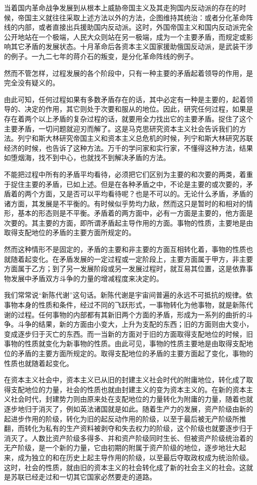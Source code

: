 当着国内革命战争发展到从根本上威胁帝国主义及其走狗国内反动派的存在的时候，帝国主义就往往采取上述方法以外的方法，企图维持其统治：或者分化革命阵线的内部，或者直接出兵援助国内反动派。这时，外国帝国主义和国内反动派完全公开地站在一个极端，人民大众则站在另一极端，成为一个主要矛盾，而规定或影响其它矛盾的发展状态。十月革命后各资本主义国家援助俄国反动派，是武装干涉的例子。一九二七年的蒋介石的叛变，是分化革命阵线的例子。

然而不管怎样，过程发展的各个阶段中，只有一种主要的矛盾起着领导的作用，是完全没有疑义的。

由此可知，任何过程如果有多数矛盾存在的话，其中必定有一种是主要的，起着领导的、决定的作用，其它则处于次要和服从的地位。因此，研究任何过程，如果是存在着两个以上矛盾的复杂过程的话，就要用全力找出它的主要矛盾。捉住了这个主要矛盾，一切问题就迎刃而解了。这是马克思研究资本主义社会告诉我们的方法。列宁和斯大林研究帝国主义和资本主义总危机的时候，列宁和斯大林研究苏联经济的时候，也告诉了这种方法。万千的学问家和实行家，不懂得这种方法，结果如堕烟海，找不到中心，也就找不到解决矛盾的方法。

不能把过程中所有的矛盾平均看待，必须把它们区别为主要的和次要的两类，着重于捉住主要的矛盾，已如上述。但是在各种矛盾之中，不论是主要的或次要的，矛盾着的两个方面，又是否可以平均看待呢？也是不可以的。无论什么矛盾，矛盾的诸方面，其发展是不平衡的。有时候似乎势均力敌，然而这只是暂时的和相对的情形，基本的形态则是不平衡。矛盾着的两方面中，必有一方面是主要的，他方面是次要的。其主要的方面，即所谓矛盾起主导作用的方面。事物的性质，主要地是由取得支配地位的矛盾的主要方面所规定的。

然而这种情形不是固定的，矛盾的主要和非主要的方面互相转化着，事物的性质也就随着起变化。在矛盾发展的一定过程或一定阶段上，主要方面属于甲方，非主要方面属于乙方；到了另一发展阶段或另一发展过程时，就互易其位置，这是依靠事物发展中矛盾双方斗争的力量的增减程度来决定的。

我们常常说“新陈代谢”这句话。新陈代谢是宇宙间普遍的永远不可抵抗的规律。依事物本身的性质和条件，经过不同的飞跃形式，一事物转化为他事物，就是新陈代谢的过程。任何事物的内部都有其新旧两个方面的矛盾，形成为一系列的曲折的斗争。斗争的结果，新的方面由小变大，上升为支配的东西；旧的方面则由大变小，变成逐步归于灭亡的东西。而一当新的方面对于旧的方面取得支配地位的时候，旧事物的性质就变化为新事物的性质。由此可见，事物的性质主要地是由取得支配地位的矛盾的主要方面所规定的。取得支配地位的矛盾的主要方面起了变化，事物的性质也就随着起变化。

在资本主义社会中，资本主义已从旧的封建主义社会时代的附庸地位，转化成了取得支配地位的力量，社会的性质也就由封建主义的变为资本主义的。在新的资本主义社会时代，封建势力则由原来处在支配地位的力量转化为附庸的力量，随着也就逐步地归于消灭了，例如英法诸国就是如此。随着生产力的发展，资产阶级由新的起进步作用的阶级，转化为旧的起反动作用的阶级，以至于最后被无产阶级所推翻，而转化为私有的生产资料被剥夺和失去权力的阶级，这个阶级也就要逐步归于消灭了。人数比资产阶级多得多、并和资产阶级同时生长、但被资产阶级统治着的无产阶级，是一个新的力量，它由初期的附属于资产阶级的地位，逐步地壮大起来，成为独立的和在历史上起主导作用的阶级，以至最后夺取政权成为统治阶级。这时，社会的性质，就由旧的资本主义的社会转化成了新的社会主义的社会。这就是苏联已经走过和一切其它国家必然要走的道路。

